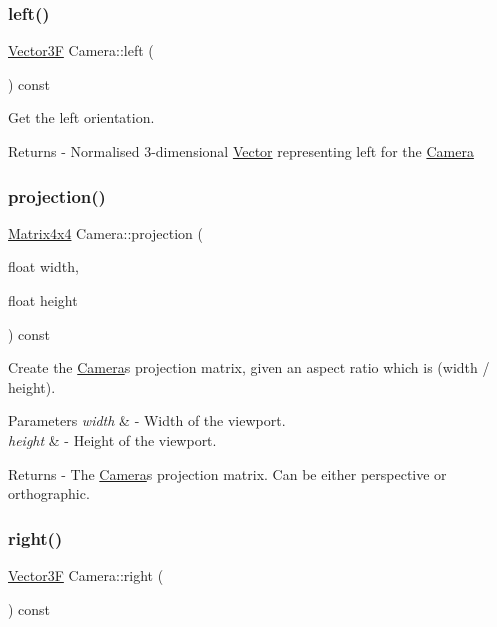 \subsubsection{\texorpdfstring{left()}{left()}}
{\footnotesize\ttfamily \mbox{\hyperlink{class_vector3}{Vector3F}} Camera\+::left (\begin{DoxyParamCaption}{ }\end{DoxyParamCaption}) const}

Get the left orientation. \begin{DoxyReturn}{Returns}
-\/ Normalised 3-\/dimensional \mbox{\hyperlink{class_vector}{Vector}} representing \textquotesingle{}left\textquotesingle{} for the \mbox{\hyperlink{class_camera}{Camera}} 
\end{DoxyReturn}
\mbox{\label{class_camera_a97d7719189209c7f3976e838bf2bd6a7}} 
\subsubsection{\texorpdfstring{projection()}{projection()}}
{\footnotesize\ttfamily \mbox{\hyperlink{class_matrix4x4}{Matrix4x4}} Camera\+::projection (\begin{DoxyParamCaption}\item[{float}]{width,  }\item[{float}]{height }\end{DoxyParamCaption}) const}

Create the \mbox{\hyperlink{class_camera}{Camera}}\textquotesingle{}s projection matrix, given an aspect ratio which is (width / height). 
\begin{DoxyParams}{Parameters}
{\em width} & -\/ Width of the viewport. \\
\hline
{\em height} & -\/ Height of the viewport. \\
\hline
\end{DoxyParams}
\begin{DoxyReturn}{Returns}
-\/ The \mbox{\hyperlink{class_camera}{Camera}}\textquotesingle{}s projection matrix. Can be either perspective or orthographic. 
\end{DoxyReturn}
\mbox{\label{class_camera_a04a615c03274f5a4c7af4164032b24e8}} 
\subsubsection{\texorpdfstring{right()}{right()}}
{\footnotesize\ttfamily \mbox{\hyperlink{class_vector3}{Vector3F}} Camera\+::right (\begin{DoxyParamCaption}{ }\end{DoxyParamCaption}) const}

